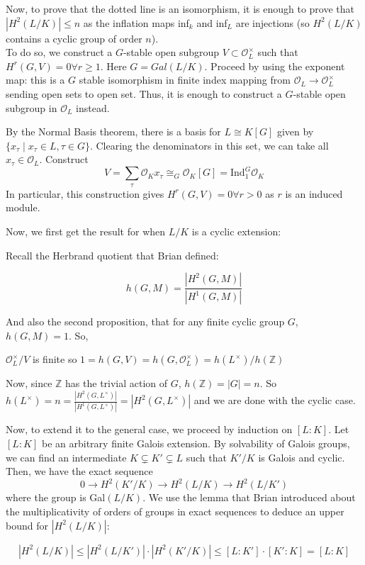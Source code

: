 Now, to prove that the dotted line is an isomorphism, it is enough to prove that $|H^2(L/K)|\leq n$ as the inflation maps inf$_k$ and inf$_L$ are injections (so $H^2(L/K)$ contains a cyclic group of order $n$).\\

To do so, we construct a $G$-stable open subgroup $V\subset \mathcal{O}_L^\times$ such that $H^r(G, V)=0\forall r\geq 1$. Here $G=Gal(L/K).$ Proceed by using the exponent map: this is a $G$ stable isomorphism in finite index mapping from $\mathcal{O}_L\rightarrow\mathcal{O}_L^\times$ sending open sets to open set. Thus, it is enough to construct a $G$-stable open subgroup in $\mathcal{O}_L$ instead. 

By the Normal Basis theorem, there is a basis for $L\cong K[G]$ given by $\{x_\tau \mid x_\tau\in L, \tau\in G\}$. Clearing the denominators in this set, we can take all $x_\tau\in \mathcal{O}_L$. Construct $$V=\sum_\tau \mathcal{O}_Kx_\tau\cong_G\mathcal{O}_K[G]=\text{Ind}_1^G\mathcal{O}_K$$ 
In particular, this construction gives $H^r(G,V)=0\forall r>0$ as $r$ is an induced module. 

Now, we first get the result for when $L/K$ is a cyclic extension: 

Recall the Herbrand quotient that Brian defined:

$$h(G,M)=\frac{|H^2(G,M)|}{|H^1(G,M)|}$$

And also the second proposition, that for any finite cyclic group $G$, $h(G,M)=1$. So,

$\mathcal{O}_L^\times/V$ is finite so $1=h(G, V)=h(G, \mathcal{O}_L^\times)=h(L^\times)/h(\mathbb{Z})$

Now, since $\mathbb{Z}$ has the trivial action of $G$, $h(\mathbb{Z})=|G|=n$. So $h(L^\times)=n=\frac{|H^2(G,L^\times)|}{|H^1(G,L^\times)|}=|H^2(G,L^\times)|$ and we are done with the cyclic case. 

Now, to extend it to the general case, we proceed by induction on $[L:K]$. Let $[L:K]$ be an arbitrary finite Galois extension. By solvability of Galois groups, we can find an intermediate $K\subsetneq K'\subsetneq L$ such that $K'/K$ is Galois and cyclic. Then, we have the exact sequence $$0\rightarrow H^2(K'/K)\rightarrow H^2(L/K)\rightarrow H^2(L/K')$$ where the group is Gal$(L/K)$. We use the lemma that Brian introduced about the multiplicativity of orders of groups in exact sequences to deduce an upper bound for $|H^2(L/K)|:$


$$|H^2(L/K)|\leq |H^2(L/K')|\cdot|H^2(K'/K)|\leq [L:K']\cdot[K':K]=[L:K]$$

